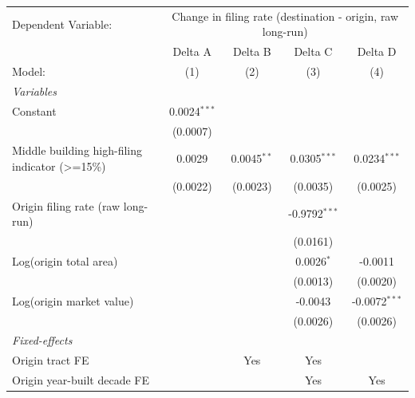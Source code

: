 \begingroup
\centering
\begin{tabular}{lcccc}
   \tabularnewline \midrule \midrule
   Dependent Variable: & \multicolumn{4}{c}{Change in filing rate (destination - origin, raw long-run)}\\
                                                   & Delta A        & Delta B       & Delta C         & Delta D \\   
   Model:                                          & (1)            & (2)           & (3)             & (4)\\  
   \midrule
   \emph{Variables}\\
   Constant                                        & 0.0024$^{***}$ &               &                 &   \\   
                                                   & (0.0007)       &               &                 &   \\   
   Middle building high-filing indicator (>=15\%)  & 0.0029         & 0.0045$^{**}$ & 0.0305$^{***}$  & 0.0234$^{***}$\\   
                                                   & (0.0022)       & (0.0023)      & (0.0035)        & (0.0025)\\   
   Origin filing rate (raw long-run)               &                &               & -0.9792$^{***}$ &   \\   
                                                   &                &               & (0.0161)        &   \\   
   Log(origin total area)                          &                &               & 0.0026$^{*}$    & -0.0011\\   
                                                   &                &               & (0.0013)        & (0.0020)\\   
   Log(origin market value)                        &                &               & -0.0043         & -0.0072$^{***}$\\   
                                                   &                &               & (0.0026)        & (0.0026)\\   
   \midrule
   \emph{Fixed-effects}\\
   Origin tract FE                                 &                & Yes           & Yes             & \\  
   Origin year-built decade FE                     &                &               & Yes             & Yes\\  

\end{tabular}

